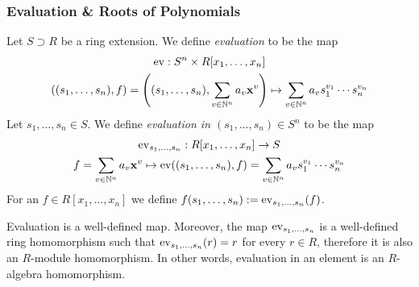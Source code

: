 \subsubsection{Evaluation \& Roots of Polynomials}
\begin{definition}
    Let $S\supset R$ be a ring extension. We define \textit{evaluation} to be the map
    \begin{gather*}
        \mathrm{ev} : S^n \times R[x_1,\dots,x_n]\\
        ((s_1,\dots,s_n),f)=\left((s_1,\dots,s_n),\sum_{v\in\mathbb{N}^n} a_v\mathbf{x}^v\right)\mapsto \sum_{v\in \mathbb{N}^n} a_vs_1^{v_1}\cdots s_n^{v_n}
    \end{gather*}
    Let $s_1,\dots,s_n\in S$. We define \textit{evaluation in $(s_1,\dots,s_n)\in S^n$} to be the map 
    \begin{gather*}
        \mathrm{ev}_{s_1,\dots,s_n} : R[x_1,\dots,x_n] \rightarrow S\\
        f = \sum_{v\in\mathbb{N}^n} a_v \mathbf{x}^v \mapsto \mathrm{ev}((s_1,\dots,s_n),f)=\sum_{v\in\mathbb{N}^n} a_vs_1^{v_1}\cdots s_n^{v_n} 
    \end{gather*}
    For an $f\in R[x_1,\dots,x_n]$ we define $f(s_1,\dots,s_n) := \mathrm{ev}_{s_1,\dots,s_n}(f)$.
\end{definition}
\begin{lemma}\label{EvaluationIsARingHomomorphism}
    Evaluation is a well-defined map. Moreover, the map $\mathrm{ev}_{s_1,\dots,s_n}$ is a well-defined ring homomorphism such that $\mathrm{ev}_{s_1,\dots,s_n}(r) = r$ for every $r\in R$, therefore it is also an $R$-module homomorphism. In other words, evaluation in an element is an $R$-algebra homomorphism. 
\end{lemma}
